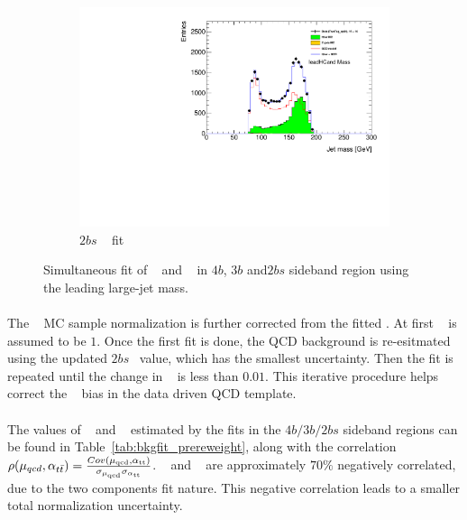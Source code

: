 \begin{figure}[htbp!]
    \hspace{-4cm}
    \begin{subfigure}[b]{0.3\textwidth}
        \includegraphics[width=\textwidth,angle=-90]{figures/boosted/Fit/fitNorm_i2s.pdf}
        \caption{$2bs$ \mleadJ~ fit}
        \label{fig:ttbar-fit-2bs}
    \end{subfigure}
   \caption{Simultaneous fit of \muqcd~ and \alphatt~ in $4b$, $3b$ and$2bs$ sideband region using the leading large-\R jet mass.}
  \label{fig:ttbar-fit}
\end{figure}

\paragraph{}
The \ttbar~ MC sample normalization is further corrected from the fitted \alphatt.
At first \alphatt~ is assumed to be $1$.
Once the first fit is done, the QCD background is re-esitmated using the updated $2bs$ \alphatt~value, which has the smallest uncertainty.
Then the fit is repeated until the change in \alphatt~ is less than $0.01$.
This iterative procedure helps correct the \alphatt~ bias in the data driven QCD template.

\paragraph{}
The values of \muqcd~ and \alphatt~ estimated by the fits in the $4b/3b/2bs$ sideband regions can be found in Table~\ref{tab:bkgfit_prereweight}, along with the correlation $\rho(\mu_{qcd},\alpha_{t\bar{t}}) = \frac{Cov(\rm \mu_{qcd},\rm \alpha_{tt})}{\rm \sigma_{\mu_{qcd}} \rm \sigma_{\alpha_{tt}} }$. 
\muqcd~ and \alphatt~  are approximately $70\%$ negatively correlated, due to the two components fit nature.
This negative correlation leads to a smaller total normalization uncertainty.

